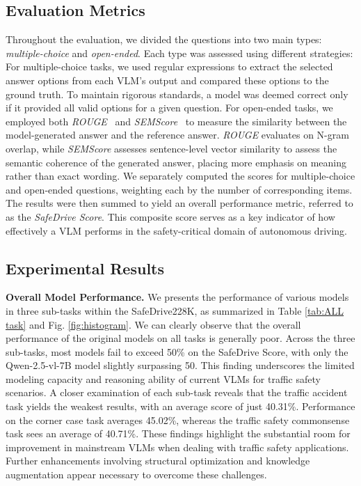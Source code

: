 \documentclass[sigconf]{acmart}
\begin{document}
\subsection{Evaluation Metrics}
Throughout the evaluation, we divided the questions into two main types: \emph{multiple-choice} and \emph{open-ended}. Each type was assessed using different strategies: For multiple-choice tasks, we used regular expressions to extract the selected answer options from each VLM’s output and compared these options to the ground truth. To maintain rigorous standards, a model was deemed correct only if it provided all valid options for a given question. For open-ended tasks, we employed both \emph{ROUGE}~\cite{lin2004rouge} and \emph{SEMScore}~\cite{aynetdinov2024semscore} to measure the similarity between the model-generated answer and the reference answer. \emph{ROUGE} evaluates on N-gram overlap, while \emph{SEMScore} assesses sentence-level vector similarity to assess the semantic coherence of the generated answer, placing more emphasis on meaning rather than exact wording. We separately computed the scores for multiple-choice and open-ended questions, weighting each by the number of corresponding items. The results were then summed to yield an overall performance metric, referred to as the \emph{SafeDrive Score}. This composite score serves as a key indicator of how effectively a VLM performs in the safety-critical domain of autonomous driving. 


\subsection{Experimental Results}



\noindent\textbf{Overall Model Performance.} We presents the performance of various models in three sub-tasks within the SafeDrive228K, as summarized in Table \ref{tab:ALL task} and Fig. \ref{fig:histogram}. We can clearly observe that the overall performance of the original models on all tasks is generally poor. Across the three sub-tasks, most models fail to exceed 50\% on the SafeDrive Score, with only the Qwen-2.5-vl-7B model slightly surpassing 50. This finding underscores the limited modeling capacity and reasoning ability of current VLMs for traffic safety scenarios. A closer examination of each sub-task reveals that the traffic accident task yields the weakest results, with an average score of just 40.31\%. Performance on the corner case task averages 45.02\%, whereas the traffic safety commonsense task sees an average of 40.71\%. These findings highlight the substantial room for improvement in mainstream VLMs when dealing with traffic safety applications. Further enhancements involving structural optimization and knowledge augmentation appear necessary to overcome these challenges.
\end{document}
